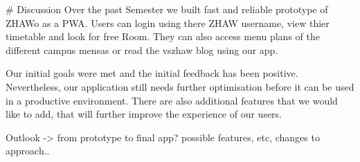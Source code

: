 \begin{markdown}

# Discussion
Over the past Semester we built fast and reliable prototype of ZHAWo as a PWA. Users can login using there ZHAW username, view thier timetable and look for free Room. They can also access menu plans of the different campus mensas or read the vszhaw blog using our app.

Our initial goals were met and the initial feedback has been positive. Nevertheless, our application still needs further optimisation before it can be used in a productive environment. There are also additional features that we would like to add, that will further improve the experience of our users.



Outlook -> from prototype to final app? possible features, etc, changes to approach..

\end{markdown}
